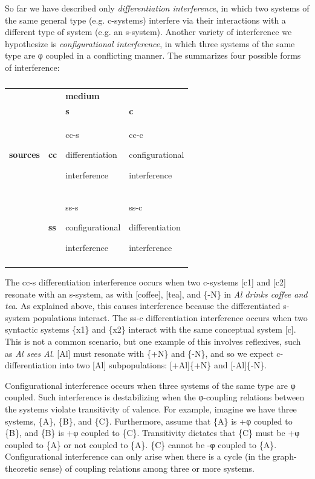   So far we have described only \textit{differentiation interference}, in which two systems of the same general type (e.g. c-systems) interfere via their interactions with a different type of system (e.g. an s-system). Another variety of interference we hypothesize is \textit{configurational interference}, in which three systems of the same type are φ coupled in a conflicting manner. The {\tablebelow} summarizes four possible forms of interference:

\begin{table}
\begin{tabularx}{\textwidth}{llXX} 
\lsptoprule
&  & \textbf{medium} & \\
&  & \textbf{s} & \textbf{c}\\
\midrule 
\textbf{sources} & \textbf{cc} & cc-s

differentiation 

interference & cc-c

configurational

interference\\
\tablevspace
& \textbf{ss} & ss-s

configurational

interference & ss-c

differentiation

interference\\
\lspbottomrule
\end{tabularx}
\caption{\missingcaption}\label{tab:4:2}
\end{table}
  The cc-s differentiation interference occurs when two c-systems [c1] and [c2] resonate with an s-system, as with [coffee], [tea], and \{-N\} in \textit{Al drinks coffee and tea}. As explained above, this causes interference because the differentiated s-system populations interact. The ss-c differentiation interference occurs when  two syntactic systems \{x1\} and \{x2\} interact with the same conceptual system [c]. This is not a common scenario, but one example of this involves reflexives, such as \textit{Al sees Al}. [Al] must resonate with \{+N\} and \{-N\}, and so we expect c-differentiation into two [Al] subpopulations: [+Al]\{+N\} and [-Al]\{-N\}.

  Configurational interference occurs when three systems of the same type are φ coupled. Such interference is destabilizing when the φ-coupling relations between the systems violate transitivity of valence. For example, imagine we have three systems, \{A\}, \{B\}, and \{C\}. Furthermore, assume that \{A\} is +φ coupled to \{B\}, and \{B\} is +φ coupled to \{C\}. Transitivity dictates that \{C\} must be +φ coupled to \{A\} or not coupled to \{A\}. \{C\} cannot be -φ coupled to \{A\}. Configurational interference can only arise when there is a cycle (in the graph-theoretic sense) of coupling relations among three or more systems. 

